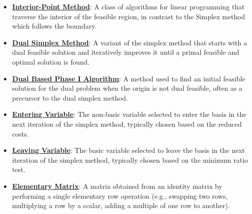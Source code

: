 \documentclass{article}%
\begin{document}
\begin{itemize}[leftmargin=*]
\item \href{https://www.math.purdue.edu/~yipn/421/2024-09-05-SimplexEfficiency.pdf#page=12}{\textbf{Interior-Point Method}}: A class of algorithms for linear programming that traverse the interior of the feasible region, in contrast to the Simplex method which follows the boundary.%
\item \href{https://www.math.purdue.edu/~yipn/421/2024-10-03-DualSimplexMatrix.pdf#page=2}{\textbf{Dual Simplex Method}}: A variant of the simplex method that starts with a dual feasible solution and iteratively improves it until a primal feasible and optimal solution is found.%
\item \href{https://www.math.purdue.edu/~yipn/421/2024-10-03-DualSimplexMatrix.pdf#page=5}{\textbf{Dual Based Phase I Algorithm}}: A method used to find an initial feasible solution for the dual problem when the origin is not dual feasible, often as a precursor to the dual simplex method.%
\item \href{https://www.math.purdue.edu/~yipn/421/2024-10-03-DualSimplexMatrix.pdf#page=9}{\textbf{Entering Variable}}: The non-basic variable selected to enter the basis in the next iteration of the simplex method, typically chosen based on the reduced costs.%
\item \href{https://www.math.purdue.edu/~yipn/421/2024-10-03-DualSimplexMatrix.pdf#page=10}{\textbf{Leaving Variable}}: The basic variable selected to leave the basis in the next iteration of the simplex method, typically chosen based on the minimum ratio test.%
\item \href{https://www.math.purdue.edu/~yipn/421/2024-10-03-DualSimplexMatrix.pdf#page=15}{\textbf{Elementary Matrix}}: A matrix obtained from an identity matrix by performing a single elementary row operation (e.g., swapping two rows, multiplying a row by a scalar, adding a multiple of one row to another).%
\end{itemize}

%
\end{document}
